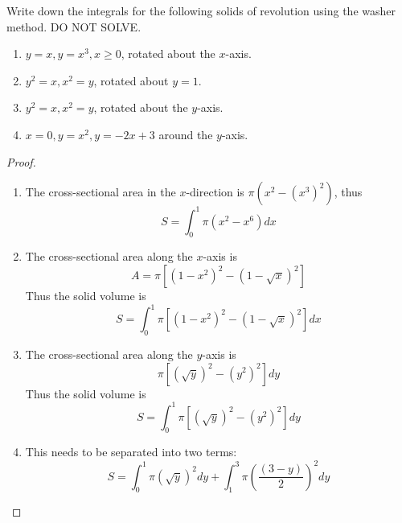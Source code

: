 \documentclass[openany]{book}
\begin{document}
\begin{prob}
    Write down the integrals for the following solids of revolution using the washer method. DO NOT SOLVE.
    \begin{enumerate}
        \item $y=x, y=x^3, x\geq 0$, rotated about the $x$-axis.
        \item $y^2=x, x^2=y$, rotated about $y=1$.
        \item $y^2=x, x^2=y$, rotated about the $y$-axis.
        \item $x=0, y=x^2, y=-2x+3$ around the $y$-axis.
    \end{enumerate}
\end{prob}
\begin{proof}
    \begin{enumerate}
        \item The cross-sectional area in the $x$-direction is $\pi(x^2-(x^3)^2)$, thus 
        \begin{equation*}
            S=\int_0^{1}\pi(x^2-x^6)dx
        \end{equation*}
        \item The cross-sectional area along the $x$-axis is 
        \begin{equation*}
            A=\pi\left[(1-x^2)^2-(1-\sqrt{x})^2\right]
        \end{equation*}
        Thus the solid volume is 
        \begin{equation*}
            S=\int_0^1\pi\left[(1-x^2)^2-(1-\sqrt{x})^2\right]dx
        \end{equation*}
        \item The cross-sectional area along the $y$-axis is 
        \begin{equation*}
            \pi\left[(\sqrt{y})^2-(y^2)^2\right]dy
        \end{equation*}
        Thus the solid volume is 
        \begin{equation*}
            S=\int_0^1\pi\left[(\sqrt{y})^2-(y^2)^2\right]dy
        \end{equation*}
        \item This needs to be separated into two terms:
        \begin{equation*}
            S=\int_0^1\pi(\sqrt{y})^2dy+\int_1^3\pi\left(\frac{(3-y)}{2}\right)^2dy
        \end{equation*}
    \end{enumerate}
\end{proof}
\end{document}
